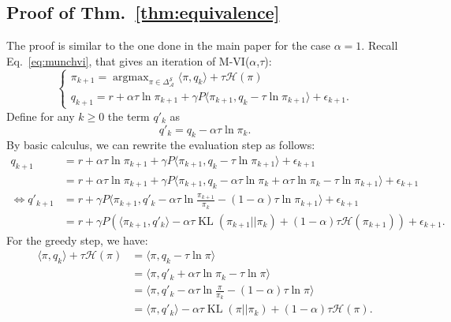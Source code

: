 \documentclass{article}
\newcommand{\h}{\mathcal{H}}
\DeclareMathOperator*{\argmax}{argmax}
\DeclareMathOperator{\kl}{KL}
\newcommand{\states}{\mathcal{S}}
\newcommand{\actions}{\mathcal{A}}
\begin{document}
\subsection{Proof of Thm.~\ref{thm:equivalence}}
\label{subappx:proof_equivalence}

The proof is similar to the one done in the main paper for the case $\alpha=1$. Recall Eq.~\eqref{eq:munchvi}, that gives an iteration of M-VI($\alpha$,$\tau$):
\begin{equation}
\begin{cases}
    \pi_{k+1} = \argmax_{\pi\in\Delta_\actions^\states}\langle\pi, q_k\rangle + \tau\mathcal{H}(\pi)
    \\
    q_{k+1} = r + \alpha\tau\ln\pi_{k+1} + \gamma P\langle\pi_{k+1}, q_k - \tau \ln \pi_{k+1}\rangle  +  \epsilon_{k+1}.
\end{cases}
\end{equation}
Define for any $k\geq 0$ the term $q'_k$ as
\begin{equation}
    q'_{k} = q_{k} - \alpha \tau \ln \pi_{k}.
\end{equation}
By basic calculus, we can rewrite the evaluation step as follows:
\begin{align}
    q_{k+1} &= r + \alpha\tau\ln\pi_{k+1} + \gamma P\langle\pi_{k+1}, q_k - \tau \ln \pi_{k+1}\rangle  +  \epsilon_{k+1}
    \\
    &=  r + \alpha\tau\ln\pi_{k+1} + \gamma P\langle\pi_{k+1}, q_k - \alpha \tau \ln \pi_k + \alpha \tau \ln \pi_k - \tau \ln \pi_{k+1}\rangle  +  \epsilon_{k+1}
    \\ \Leftrightarrow
    q'_{k+1} &=  r  + \gamma P\langle\pi_{k+1}, q'_k  - \alpha \tau \ln \frac{\pi_{k+1}}{\pi_k} - (1-\alpha) \tau \ln \pi_{k+1} \rangle  +  \epsilon_{k+1}
    \\
    &= r + \gamma P\left(\langle\pi_{k+1}, q'_k\rangle  - \alpha \tau \kl(\pi_{k+1}||\pi_k) + (1-\alpha) \tau \h(\pi_{k + 1}) \right)  +  \epsilon_{k+1}.
\end{align}
For the greedy step, we have:
\begin{align}
    \langle\pi, q_k\rangle + \tau\mathcal{H}(\pi) &= \langle \pi, q_k - \tau \ln\pi\rangle
    \\
    &= \langle\pi, q'_k + \alpha \tau \ln \pi_k - \tau \ln \pi\rangle
    \\
    &= \langle\pi, q'_k - \alpha \tau \ln\frac{\pi}{\pi_k} - (1-\alpha)\tau \ln\pi\rangle
    \\
    &= \langle \pi, q'_k \rangle - \alpha \tau \kl(\pi||\pi_k) + (1-\alpha)\tau \h(\pi).
\end{align}
\end{document}
